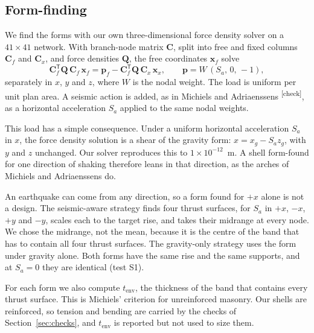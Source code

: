 \documentclass[preprint,12pt]{elsarticle}
\newcommand{\chk}{\textsuperscript{\textcolor{markcol}{\sffamily\scriptsize[check]}}}
\newcommand{\chk}{}
\begin{document}
\begin{table}[!htbp]
\centering
\caption{Design space. Each design is sized separately and has one uniform thickness. Corner-supported free edges are drawn in by $0.10L$ at mid-edge.}
\label{tab:design}

\end{table}

\subsection{Form-finding}

We find the forms with our own three-dimensional force density solver \cite{Schek1974} on a $41 \times 41$ network. With branch-node matrix $\mathbf{C}$, split into free and fixed columns $\mathbf{C}_f$ and $\mathbf{C}_x$, and force densities $\mathbf{Q}$, the free coordinates $\mathbf{x}_f$ solve
\begin{equation}
\mathbf{C}_f^{\mathsf T}\mathbf{Q}\,\mathbf{C}_f\,\mathbf{x}_f = \mathbf{p}_f - \mathbf{C}_f^{\mathsf T}\mathbf{Q}\,\mathbf{C}_x\,\mathbf{x}_x, \qquad \mathbf{p} = W\,(S_a,\,0,\,-1),
\label{eq:fdm}
\end{equation}
separately in $x$, $y$ and $z$, where $W$ is the nodal weight. The load is uniform per unit plan area. A seismic action is added, as in Michiels and Adriaenssens \cite{Michiels2018CS}\chk, as a horizontal acceleration $S_a$ applied to the same nodal weights.

This load has a simple consequence. Under a uniform horizontal acceleration $S_a$ in $x$, the force density solution is a shear of the gravity form: $x = x_g - S_a z_g$, with $y$ and $z$ unchanged. Our solver reproduces this to $1 \times 10^{-12}$~m. A shell form-found for one direction of shaking therefore leans in that direction, as the arches of Michiels and Adriaenssens do.

An earthquake can come from any direction, so a form found for $+x$ alone is not a design. The seismic-aware strategy finds four thrust surfaces, for $S_a$ in $+x$, $-x$, $+y$ and $-y$, scales each to the target rise, and takes their midrange at every node. We chose the midrange, not the mean, because it is the centre of the band that has to contain all four thrust surfaces. The gravity-only strategy uses the form under gravity alone. Both forms have the same rise and the same supports, and at $S_a = 0$ they are identical (test S1).

For each form we also compute $t_\mathrm{env}$, the thickness of the band that contains every thrust surface. This is Michiels' criterion for unreinforced masonry. Our shells are reinforced, so tension and bending are carried by the checks of Section~\ref{sec:checks}, and $t_\mathrm{env}$ is reported but not used to size them.
\end{document}
